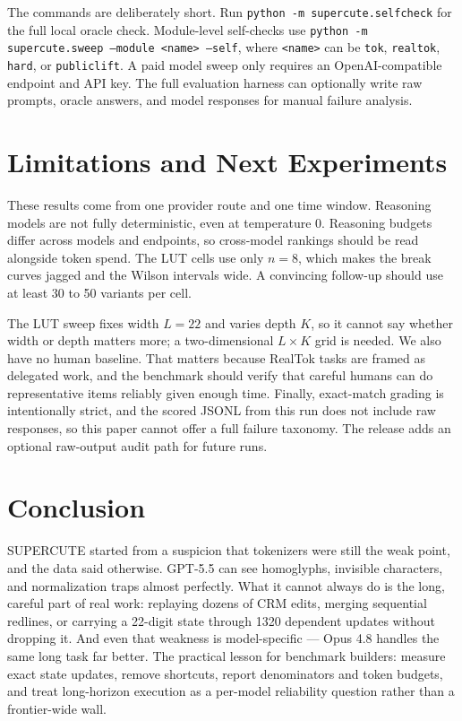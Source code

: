 \documentclass[10pt,twocolumn]{article}
\newcommand{\task}[1]{\texttt{#1}}
\begin{document}
The commands are deliberately short. Run \task{python -m supercute.selfcheck} for the full local oracle check. Module-level self-checks use \task{python -m supercute.sweep --module <name> --self}, where \task{<name>} can be \task{tok}, \task{realtok}, \task{hard}, or \task{publiclift}. A paid model sweep only requires an OpenAI-compatible endpoint and API key. The full evaluation harness can optionally write raw prompts, oracle answers, and model responses for manual failure analysis.

\section{Limitations and Next Experiments}
These results come from one provider route and one time window. Reasoning models are not fully deterministic, even at temperature 0. Reasoning budgets differ across models and endpoints, so cross-model rankings should be read alongside token spend. The LUT cells use only $n=8$, which makes the break curves jagged and the Wilson intervals wide. A convincing follow-up should use at least 30 to 50 variants per cell.

The LUT sweep fixes width $L=22$ and varies depth $K$, so it cannot say whether width or depth matters more; a two-dimensional $L\times K$ grid is needed. We also have no human baseline. That matters because RealTok tasks are framed as delegated work, and the benchmark should verify that careful humans can do representative items reliably given enough time. Finally, exact-match grading is intentionally strict, and the scored JSONL from this run does not include raw responses, so this paper cannot offer a full failure taxonomy. The release adds an optional raw-output audit path for future runs.

\section{Conclusion}
SUPERCUTE started from a suspicion that tokenizers were still the weak point, and the data said otherwise. GPT-5.5 can see homoglyphs, invisible characters, and normalization traps almost perfectly. What it cannot always do is the long, careful part of real work: replaying dozens of CRM edits, merging sequential redlines, or carrying a 22-digit state through 1320 dependent updates without dropping it. And even that weakness is model-specific --- Opus 4.8 handles the same long task far better. The practical lesson for benchmark builders: measure exact state updates, remove shortcuts, report denominators and token budgets, and treat long-horizon execution as a per-model reliability question rather than a frontier-wide wall.
\end{document}
